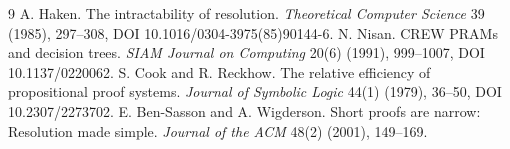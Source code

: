 \documentclass[11pt]{article}
\begin{document}
\begin{thebibliography}{9}
 A. Haken. The intractability of resolution. \emph{Theoretical Computer Science} 39 (1985), 297--308, DOI 10.1016/0304-3975(85)90144-6.
 N. Nisan. CREW PRAMs and decision trees. \emph{SIAM Journal on Computing} 20(6) (1991), 999--1007, DOI 10.1137/0220062.
 S. Cook and R. Reckhow. The relative efficiency of propositional proof systems. \emph{Journal of Symbolic Logic} 44(1) (1979), 36--50, DOI 10.2307/2273702.
 E. Ben-Sasson and A. Wigderson. Short proofs are narrow: Resolution made simple. \emph{Journal of the ACM} 48(2) (2001), 149--169.
\end{thebibliography}
\end{document}
